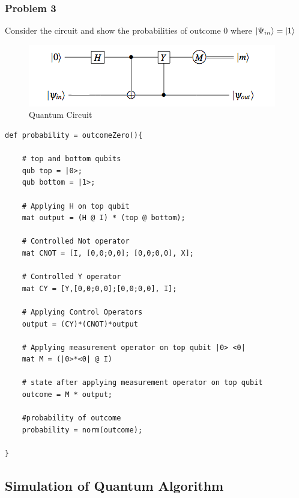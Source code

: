 \subsubsection{Problem 3}
Consider the circuit and show the probabilities of outcome 0 where $|\Psi_{in}\rangle = |1\rangle$
\begin{figure}[h!]
\begin{center}
\includegraphics{circuit2}
\end{center}
\caption{ Quantum Circuit 
\label{cir1}}
\end{figure}

\begin{lstlisting}
def probability = outcomeZero(){
	
	# top and bottom qubits
	qub top = |0>;
	qub bottom = |1>;
	
	# Applying H on top qubit 
	mat output = (H @ I) * (top @ bottom);
	
	# Controlled Not operator
	mat CNOT = [I, [0,0;0,0]; [0,0;0,0], X];
	
	# Controlled Y operator
	mat CY = [Y,[0,0;0,0];[0,0;0,0], I];
	
	# Applying Control Operators
	output = (CY)*(CNOT)*output
	
	# Applying measurement operator on top qubit |0> <0|
	mat M = (|0>*<0| @ I)
	
	# state after applying measurement operator on top qubit
	outcome = M * output;
	
	#probability of outcome
	probability = norm(outcome);
	
}
\end{lstlisting}

\subsection{ Simulation of Quantum Algorithm}

